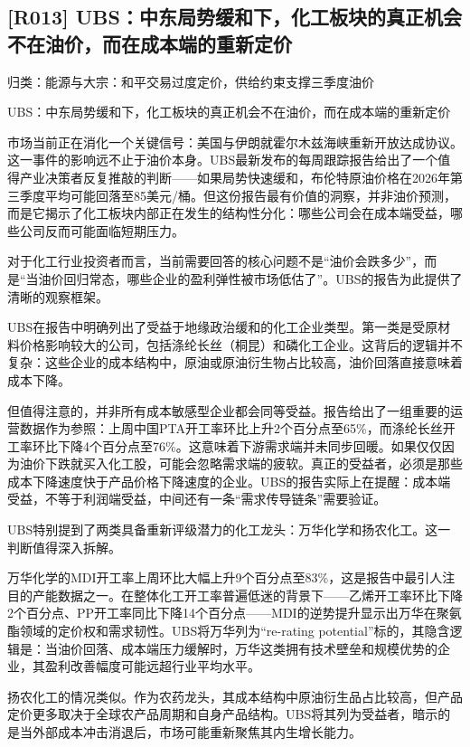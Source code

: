 \documentclass[11pt]{ctexart}
\begin{document}
\subsection{[R013] UBS：中东局势缓和下，化工板块的真正机会不在油价，而在成本端的重新定价}
{\small\color{refgray}归类：能源与大宗：和平交易过度定价，供给约束支撑三季度油价}

UBS：中东局势缓和下，化工板块的真正机会不在油价，而在成本端的重新定价

市场当前正在消化一个关键信号：美国与伊朗就霍尔木兹海峡重新开放达成协议。这一事件的影响远不止于油价本身。UBS最新发布的每周跟踪报告给出了一个值得产业决策者反复推敲的判断——如果局势快速缓和，布伦特原油价格在2026年第三季度平均可能回落至85美元/桶。但这份报告最有价值的洞察，并非油价预测，而是它揭示了化工板块内部正在发生的结构性分化：哪些公司会在成本端受益，哪些公司反而可能面临短期压力。

对于化工行业投资者而言，当前需要回答的核心问题不是“油价会跌多少”，而是“当油价回归常态，哪些企业的盈利弹性被市场低估了”。UBS的报告为此提供了清晰的观察框架。

UBS在报告中明确列出了受益于地缘政治缓和的化工企业类型。第一类是受原材料价格影响较大的公司，包括涤纶长丝（桐昆）和磷化工企业。这背后的逻辑并不复杂：这些企业的成本结构中，原油或原油衍生物占比较高，油价回落直接意味着成本下降。

但值得注意的，并非所有成本敏感型企业都会同等受益。报告给出了一组重要的运营数据作为参照：上周中国PTA开工率环比上升2个百分点至65\%，而涤纶长丝开工率环比下降4个百分点至76\%。这意味着下游需求端并未同步回暖。如果仅仅因为油价下跌就买入化工股，可能会忽略需求端的疲软。真正的受益者，必须是那些成本下降速度快于产品价格下降速度的企业。UBS的报告实际上在提醒：成本端受益，不等于利润端受益，中间还有一条“需求传导链条”需要验证。

UBS特别提到了两类具备重新评级潜力的化工龙头：万华化学和扬农化工。这一判断值得深入拆解。

万华化学的MDI开工率上周环比大幅上升9个百分点至83\%，这是报告中最引人注目的产能数据之一。在整体化工开工率普遍低迷的背景下——乙烯开工率环比下降2个百分点、PP开工率同比下降14个百分点——MDI的逆势提升显示出万华在聚氨酯领域的定价权和需求韧性。UBS将万华列为“re-rating potential”标的，其隐含逻辑是：当油价回落、成本端压力缓解时，万华这类拥有技术壁垒和规模优势的企业，其盈利改善幅度可能远超行业平均水平。

扬农化工的情况类似。作为农药龙头，其成本结构中原油衍生品占比较高，但产品定价更多取决于全球农产品周期和自身产品结构。UBS将其列为受益者，暗示的是当外部成本冲击消退后，市场可能重新聚焦其内生增长能力。
\end{document}
